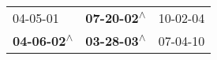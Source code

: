 \begin{supertabular}{lll}
                  04-05-01\textsuperscript{} &  \textbf{07-20-02\textsuperscript{$\wedge$}} &  10-02-04\textsuperscript{} \\
 \textbf{04-06-02\textsuperscript{$\wedge$}} &  \textbf{03-28-03\textsuperscript{$\wedge$}} &  07-04-10\textsuperscript{} \\
\end{supertabular}
